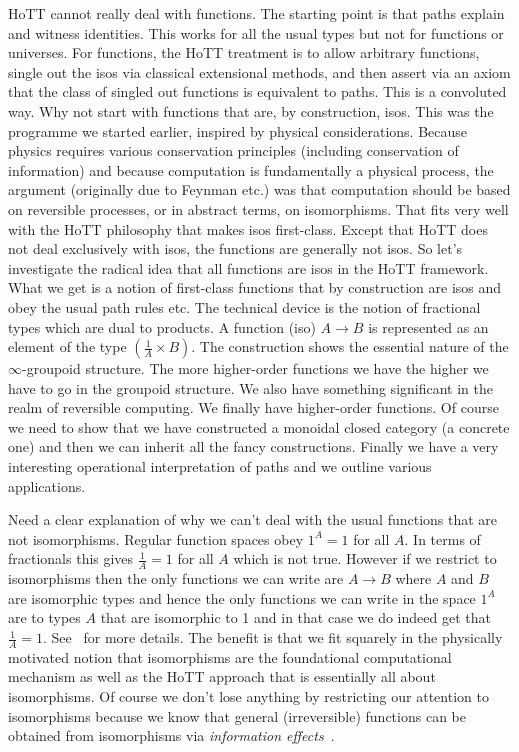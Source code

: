 \documentclass[11pt]{article}
\begin{document}
HoTT cannot really deal with functions. The starting point is that paths
explain and witness identities. This works for all the usual types but not
for functions or universes. For functions, the HoTT treatment is to allow
arbitrary functions, single out the isos via classical extensional methods,
and then assert via an axiom that the class of singled out functions is
equivalent to paths. This is a convoluted way. Why not start with functions
that are, by construction, isos. This was the programme we started earlier,
inspired by physical considerations. Because physics requires various
conservation principles (including conservation of information) and because
computation is fundamentally a physical process, the argument (originally due
to Feynman etc.) was that computation should be based on reversible
processes, or in abstract terms, on isomorphisms. That fits very well with
the HoTT philosophy that makes isos first-class. Except that HoTT does not
deal exclusively with isos, the functions are generally not isos. So let's
investigate the radical idea that all functions are isos in the HoTT
framework. What we get is a notion of first-class functions that by
construction are isos and obey the usual path rules etc. The technical device
is the notion of fractional types which are dual to products. A function
(iso) $A \rightarrow B$ is represented as an element of the type
$(\frac{1}{A} \times B)$. The construction shows the essential nature of the
$\infty$-groupoid structure. The more higher-order functions we have the
higher we have to go in the groupoid structure. We also have something
significant in the realm of reversible computing. We finally have
higher-order functions. Of course we need to show that we have constructed a
monoidal closed category (a concrete one) and then we can inherit all the
fancy constructions. Finally we have a very interesting operational
interpretation of paths and we outline various applications.

Need a clear explanation of why we can't deal with the usual functions that
are not isomorphisms. Regular function spaces obey $1^A = 1$ for all $A$. In
terms of fractionals this gives $\frac{1}{A} = 1$ for all $A$ which is not
true. However if we restrict to isomorphisms then the only functions we can
write are $A \rightarrow B$ where $A$ and $B$ are isomorphic types and hence
the only functions we can write in the space $1^A$ are to types $A$ that are
isomorphic to 1 and in that case we do indeed get that $\frac{1}{A} =
1$. See~\cite{fiore-remarks} for more details. The benefit is that we fit
squarely in the physically motivated notion that isomorphisms are the
foundational computational mechanism as well as the HoTT approach that is
essentially all about isomorphisms. Of course we don't lose anything by
restricting our attention to isomorphisms because we know that general
(irreversible) functions can be obtained from isomorphisms via
\emph{information effects}~\cite{James:2012:IE:2103656.2103667}.
\end{document}

